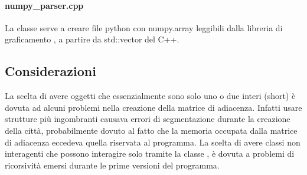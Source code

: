 \documentclass[main.tex]{subfiles}
\begin{document}
        \paragraph{numpy\_parser.cpp}
        La classe  serve a creare file python con numpy.array leggibili dalla libreria di graficamento , 
            a partire da std::vector del C++.
    
    \subsection{Considerazioni}
        La scelta di avere oggetti che essenzialmente sono solo uno o due interi (short) è dovuta ad alcuni problemi nella creazione della matrice di adiacenza.
        Infatti usare strutture più ingombranti causava errori di segmentazione durante la creazione della città, probabilmente dovuto al fatto che la memoria
        occupata dalla matrice di adiacenza eccedeva quella riservata al programma.
        La scelta di avere classi non interagenti che possono interagire solo tramite la classe , è dovuta a problemi di ricorsività
        emersi durante le prime versioni del programma. 
    
\end{document}
